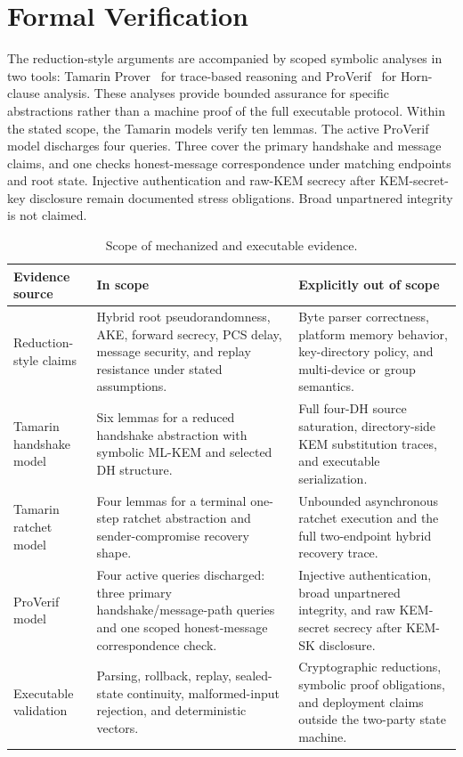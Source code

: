 \documentclass[preprint,12pt]{elsarticle}
\theoremstyle{definition}
\begin{document}
\section{Formal Verification}\label{sec:formal}

The reduction-style arguments are accompanied by scoped symbolic analyses in two tools:
Tamarin Prover~\cite{meier2013} for trace-based reasoning and
ProVerif~\cite{blanchet2016} for Horn-clause analysis. These analyses provide
bounded assurance for specific abstractions rather than a machine proof of the
full executable protocol. Within the stated scope, the Tamarin models verify
ten lemmas. The active ProVerif model discharges four queries. Three cover the
primary handshake and message claims, and one checks honest-message
correspondence under matching endpoints and root state. Injective authentication
and raw-KEM secrecy after KEM-secret-key disclosure remain documented stress
obligations. Broad unpartnered integrity is not claimed.

\begin{table}[tbp]
\centering
\caption{Scope of mechanized and executable evidence.}
\label{tab:verification-scope}
\small
\begin{tabularx}{\textwidth}{@{}L{0.22\textwidth}L{0.35\textwidth}Y@{}}
\toprule
Evidence source & In scope & Explicitly out of scope \\
\midrule
Reduction-style claims & Hybrid root pseudorandomness, AKE, forward secrecy, PCS delay, message security, and replay resistance under stated assumptions. & Byte parser correctness, platform memory behavior, key-directory policy, and multi-device or group semantics. \\
Tamarin handshake model & Six lemmas for a reduced handshake abstraction with symbolic ML-KEM and selected DH structure. & Full four-DH source saturation, directory-side KEM substitution traces, and executable serialization. \\
Tamarin ratchet model & Four lemmas for a terminal one-step ratchet abstraction and sender-compromise recovery shape. & Unbounded asynchronous ratchet execution and the full two-endpoint hybrid recovery trace. \\
ProVerif model & Four active queries discharged: three primary handshake/message-path queries and one scoped honest-message correspondence check. & Injective authentication, broad unpartnered integrity, and raw KEM-secret secrecy after KEM-SK disclosure. \\
Executable validation & Parsing, rollback, replay, sealed-state continuity, malformed-input rejection, and deterministic vectors. & Cryptographic reductions, symbolic proof obligations, and deployment claims outside the two-party state machine. \\
\bottomrule
\end{tabularx}
\end{table}
\end{document}
